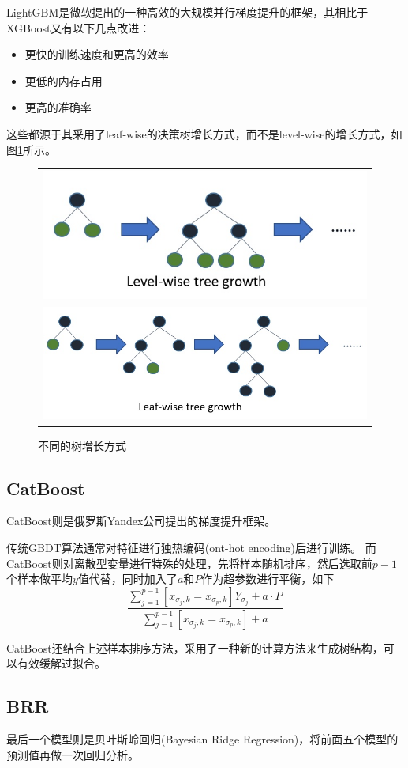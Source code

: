 \documentclass[logo,reportComp]{thesis}
\begin{document}
LightGBM是微软提出的一种高效的大规模并行梯度提升的框架，其相比于XGBoost又有以下几点改进：
\begin{itemize}
	\item 更快的训练速度和更高的效率
	\item 更低的内存占用
	\item 更高的准确率
\end{itemize}

这些都源于其采用了leaf-wise的决策树增长方式，而不是level-wise的增长方式，如图\ref{fig:tree-growth}所示。
\begin{figure}[H]
\centering
\begin{tabular}{c}
\includegraphics[width=0.6\linewidth]{fig/level-wise.jpg}\\
\includegraphics[width=0.6\linewidth]{fig/leaf-wise.jpg}
\end{tabular}
\caption{不同的树增长方式}
\label{fig:tree-growth}
\end{figure}

\subsection{CatBoost}
CatBoost则是俄罗斯Yandex公司提出的梯度提升框架。

传统GBDT算法通常对特征进行独热编码(ont-hot encoding)后进行训练。
而CatBoost则对离散型变量进行特殊的处理，先将样本随机排序，然后选取前$p-1$个样本做平均$y$值代替，同时加入了$a$和$P$作为超参数进行平衡，如下
\[\frac{\sum_{j=1}^{p-1}[x_{\sigma_j,k}=x_{\sigma_p,k}]Y_{\sigma_j}+a\cdot P}{\sum_{j=1}^{p-1}[x_{\sigma_j,k}=x_{\sigma_p,k}]+a}\]

CatBoost还结合上述样本排序方法，采用了一种新的计算方法来生成树结构，可以有效缓解过拟合。


\subsection{BRR}
最后一个模型则是贝叶斯岭回归(Bayesian Ridge Regression)，将前面五个模型的预测值再做一次回归分析。
\end{document}
